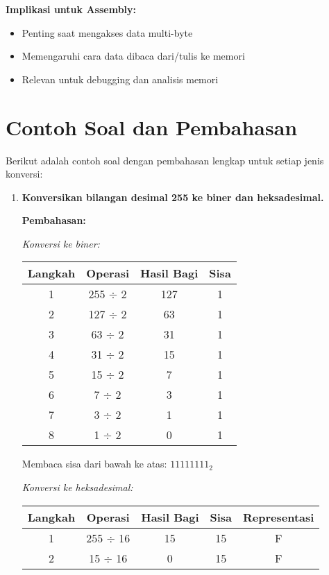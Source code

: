 \textbf{Implikasi untuk Assembly:}
\begin{itemize}
    \item Penting saat mengakses data multi-byte
    \item Memengaruhi cara data dibaca dari/tulis ke memori
    \item Relevan untuk debugging dan analisis memori
\end{itemize}

\section{Contoh Soal dan Pembahasan}\label{sec:pengenalan-contoh}

Berikut adalah contoh soal dengan pembahasan lengkap untuk setiap jenis konversi:

\begin{enumerate}
    \item \textbf{Konversikan bilangan desimal 255 ke biner dan heksadesimal.}
    
    \textbf{Pembahasan:}
    
    \textit{Konversi ke biner:}
    \begin{center}
    \begin{tabular}{|c|c|c|c|}
    \hline
    \textbf{Langkah} & \textbf{Operasi} & \textbf{Hasil Bagi} & \textbf{Sisa} \\
    \hline
    1 & 255 $\div$ 2 & 127 & 1 \\
    2 & 127 $\div$ 2 & 63 & 1 \\
    3 & 63 $\div$ 2 & 31 & 1 \\
    4 & 31 $\div$ 2 & 15 & 1 \\
    5 & 15 $\div$ 2 & 7 & 1 \\
    6 & 7 $\div$ 2 & 3 & 1 \\
    7 & 3 $\div$ 2 & 1 & 1 \\
    8 & 1 $\div$ 2 & 0 & 1 \\
    \hline
    \end{tabular}
    \end{center}
    
    Membaca sisa dari bawah ke atas: \(11111111_2\)
    
    \textit{Konversi ke heksadesimal:}
    \begin{center}
    \begin{tabular}{|c|c|c|c|c|}
    \hline
    \textbf{Langkah} & \textbf{Operasi} & \textbf{Hasil Bagi} & \textbf{Sisa} & \textbf{Representasi} \\
    \hline
    1 & 255 $\div$ 16 & 15 & 15 & F \\
    2 & 15 $\div$ 16 & 0 & 15 & F \\
    \hline
    \end{tabular}
    \end{center}
    

\end{enumerate}
